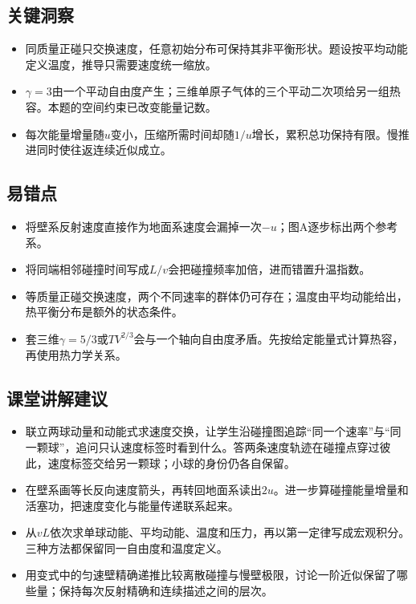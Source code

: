 \documentclass[UTF8,fontset=fandol,a4paper,11pt]{ctexart}
\begin{document}


\subsection*{关键洞察}

\begin{itemize}
\item 同质量正碰只交换速度，任意初始分布可保持其非平衡形状。题设按平均动能定义温度，推导只需要速度统一缩放。
\item $\gamma=3$由一个平动自由度产生；三维单原子气体的三个平动二次项给另一组热容。本题的空间约束已改变能量记数。
\item 每次能量增量随$u$变小，压缩所需时间却随$1/u$增长，累积总功保持有限。慢推进同时使往返连续近似成立。
\end{itemize}



\subsection*{易错点}

\begin{itemize}
\item 将壁系反射速度直接作为地面系速度会漏掉一次$-u$；图A逐步标出两个参考系。
\item 将同端相邻碰撞时间写成$L/v$会把碰撞频率加倍，进而错置升温指数。
\item 等质量正碰交换速度，两个不同速率的群体仍可存在；温度由平均动能给出，热平衡分布是额外的状态条件。
\item 套三维$\gamma=5/3$或$TV^{2/3}$会与一个轴向自由度矛盾。先按给定能量式计算热容，再使用热力学关系。
\end{itemize}



\subsection*{课堂讲解建议}

\begin{itemize}
\item 联立两球动量和动能式求速度交换，让学生沿碰撞图追踪“同一个速率”与“同一颗球”，追问只认速度标签时看到什么。答两条速度轨迹在碰撞点穿过彼此，速度标签交给另一颗球；小球的身份仍各自保留。
\item 在壁系画等长反向速度箭头，再转回地面系读出$2u$。进一步算碰撞能量增量和活塞功，把速度变化与能量传递联系起来。
\item 从$vL$依次求单球动能、平均动能、温度和压力，再以第一定律写成宏观积分。三种方法都保留同一自由度和温度定义。
\item 用变式中的匀速壁精确递推比较离散碰撞与慢壁极限，讨论一阶近似保留了哪些量；保持每次反射精确和连续描述之间的层次。
\end{itemize}
\end{document}
